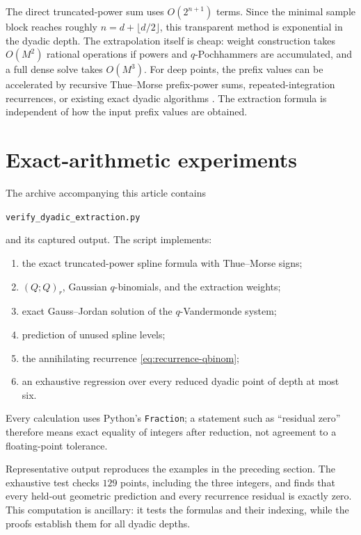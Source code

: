 \documentclass[11pt]{article}
\begin{document}
The direct truncated-power sum uses \(O(2^{n+1})\) terms.  Since the minimal
sample block reaches roughly \(n=d+\lfloor d/2\rfloor\), this transparent
method is exponential in the dyadic depth.  The extrapolation itself is cheap:
weight construction takes \(O(M^2)\) rational operations if powers and
\(q\)-Pochhammers are accumulated, and a full dense solve takes \(O(M^3)\).
For deep points, the prefix values can be accelerated by recursive
Thue--Morse prefix-power sums, repeated-integration recurrences, or existing
exact dyadic algorithms \cite{AriasArithmetic,Haugland2016}.  The extraction
formula is independent of how the input prefix values are obtained.

\section{Exact-arithmetic experiments}

The archive accompanying this article contains
\begin{center}
\texttt{verify\_dyadic\_extraction.py}
\end{center}
and its captured output.  The script implements:
\begin{enumerate}[leftmargin=2.2em]
\item the exact truncated-power spline formula with Thue--Morse signs;
\item \((Q;Q)_r\), Gaussian \(q\)-binomials, and the extraction weights;
\item exact Gauss--Jordan solution of the \(q\)-Vandermonde system;
\item prediction of unused spline levels;
\item the annihilating recurrence \cref{eq:recurrence-qbinom};
\item an exhaustive regression over every reduced dyadic point of depth at
      most six.
\end{enumerate}
Every calculation uses Python's \texttt{Fraction}; a statement such as
``residual zero'' therefore means exact equality of integers after reduction,
not agreement to a floating-point tolerance.

Representative output reproduces the examples in the preceding section.  The
exhaustive test checks \(129\) points, including the three integers, and finds
that every held-out geometric prediction and every recurrence residual is
exactly zero.  This computation is ancillary: it tests the formulas and their
indexing, while the proofs establish them for all dyadic depths.
\end{document}
